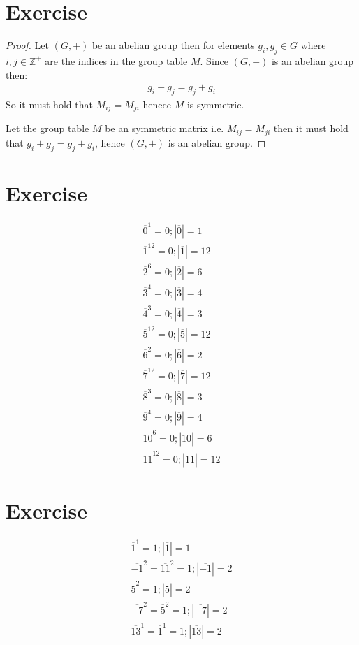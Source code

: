 \documentclass{article}
\begin{document}
\section{Exercise}
\begin{proof}
    Let $(G, +)$ be an abelian group then for elements $g_i, g_j \in G$ where $i, j
    \in \mathbb{Z}^+$ are the indices in the group table $M$. Since $(G, +)$ is an
    abelian group then:
    \begin{align*}
        g_i + g_j = g_j + g_i
    \end{align*}
    So it must hold that $M_{ij} = M_{ji}$ henece $M$ is symmetric.
    
    Let the group table $M$ be an symmetric matrix i.e. $M_{ij} = M_{ji}$ then it
    must hold that $g_i + g_j = g_j + g_i$, hence $(G, +)$ is an abelian group.
\end{proof}
\section{Exercise}
\begin{align*}
    \overline{0}^1 = 0; |\overline{0}| = 1 \\
    \overline{1}^12 = 0; |\overline{1}| = 12 \\
    \overline{2}^6 = 0; |\overline{2}| = 6 \\
    \overline{3}^4 = 0; |\overline{3}| = 4 \\
    \overline{4}^3 = 0; |\overline{4}| = 3 \\
    \overline{5}^{12} = 0; |\overline{5}| = 12 \\
    \overline{6}^2 = 0; |\overline{6}| = 2 \\
    \overline{7}^{12} = 0; |\overline{7}| = 12 \\
    \overline{8}^{3} = 0; |\overline{8}| = 3 \\
    \overline{9}^{4} = 0; |\overline{9}| = 4 \\
    \overline{10}^{6} = 0; |\overline{10}| = 6 \\
    \overline{11}^{12} = 0; |\overline{11}| = 12 
\end{align*}
\section{Exercise}
\begin{align*}
    \overline{1}^1 = 1; |\overline{1}| = 1 \\
    \overline{-1}^{2} = \overline{11}^{2} = 1; |\overline{-1}| = 2 \\
    \overline{5}^{2} = 1; |\overline{5}| = 2 \\
    \overline{-7}^{2} = \overline{5}^{2} = 1; |\overline{-7}| = 2 \\
    \overline{13}^{1} = \overline{1}^{1} = 1; |\overline{13}| = 2
\end{align*}
\end{document}
